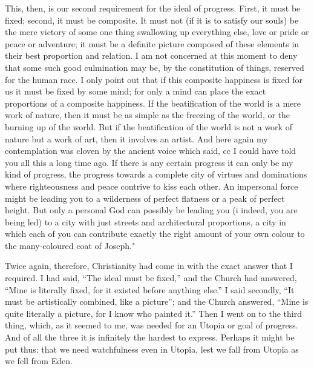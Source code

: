 \documentclass{book}
\begin{document}
This, then, is our second requirement for the ideal of progress. First, it must be fixed; second, it must be composite. It must not (if it is to satisfy our souls) be the mere victory of some one thing swallowing up everything else, love or pride or peace or adventure; it must be a definite picture composed of these elements in their best proportion and relation. I am not concerned at this moment to deny that some such good culmination may be, by the constitution of things, reserved for the human race. I only point out that if this composite happiness is fixed for us it must be fixed by some mind; for only a mind can place the exact proportions of a composite happiness. If the beatification of the world is a mere work of nature, then it must be as simple as the freezing of the world, or the burning up of the world. But if the beatification of the world is not a work of nature but a work of art, then it involves an artist. And here again my contemplation was cloven by the ancient voice which said, cc I could have told you all this a long time ago. If there is any certain progress it can only be my kind of progress, the progress towards a complete city of virtues and dominations where righteousness and peace contrive to kiss each other. An impersonal force might be leading you to a wilderness of perfect flatness or a peak of perfect height. But only a personal God can possibly be leading you (i indeed, you are being led) to a city with just streets and architectural proportions, a city in which each of you can contribute exactly the right amount of your own colour to the many-coloured coat of Joseph."

Twice again, therefore, Christianity had come in with the exact answer that I required. I had said, “The ideal must be fixed,” and the Church had answered, “Mine is literally fixed, for it existed before anything else.” I said secondly, “It must be artistically combined, like a picture”; and the Church answered, “Mine is quite literally a picture, for I know who painted it.” Then I went on to the third thing, which, as it seemed to me, was needed for an Utopia or goal of progress. And of all the three it is infinitely the hardest to express. Perhaps it might be put thus: that we need watchfulness even in Utopia, lest we fall from Utopia as we fell from Eden.
\end{document}
